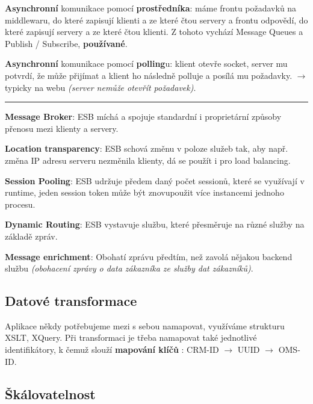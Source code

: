 \vspace{4pt}
\noindent \textbf{Asynchronní} komunikace pomocí \textbf{prostředníka}: máme frontu požadavků na middlewaru, do které zapisují klienti a ze které čtou servery a frontu odpovědí, do které zapisují servery a ze které čtou klienti. Z tohoto vychází Message Queues a Publish / Subscribe, \textbf{používané}.

\vspace{4pt}
\noindent \textbf{Asynchronní} komunikace pomocí \textbf{polling}u: klient otevře socket, server mu potvrdí, že může přijímat a klient ho následně polluje a posílá mu požadavky. $\to$ typicky na webu \textit{(server nemůže otevřít požadavek)}.

\noindent\rule{\textwidth}{0.4pt}

\vspace{4pt}
\noindent \textbf{Message Broker}: ESB míchá a spojuje standardní i proprietární způsoby přenosu mezi klienty a servery.

\vspace{4pt}
\noindent \textbf{Location transparency}: ESB schová změnu v poloze služeb tak, aby např. změna IP adresu serveru nezměnila klienty, dá se použít i pro load balancing.

\vspace{4pt}
\noindent \textbf{Session Pooling}: ESB udržuje předem daný počet sessionů, které se využívají v runtime, jeden session token může být znovupoužit více instancemi jednoho procesu.

\vspace{4pt}
\noindent \textbf{Dynamic Routing}: ESB vystavuje službu, které přesměruje na různé služby na základě zpráv.

\vspace{4pt}
\noindent \textbf{Message enrichment}: Obohatí zprávu předtím, než zavolá nějakou backend službu \textit{(obohacení zprávy o data zákazníka ze služby dat zákazníků)}.

\subsection{Datové transformace}

Aplikace někdy potřebujeme mezi s sebou namapovat, využíváme strukturu XSLT, XQuery. Při transformaci je třeba namapovat také jednotlivé identifikátory, k čemuž slouží \textbf{mapování klíčů} : CRM-ID $\to$ UUID $\to$ OMS-ID.

\subsection{Škálovatelnost}

